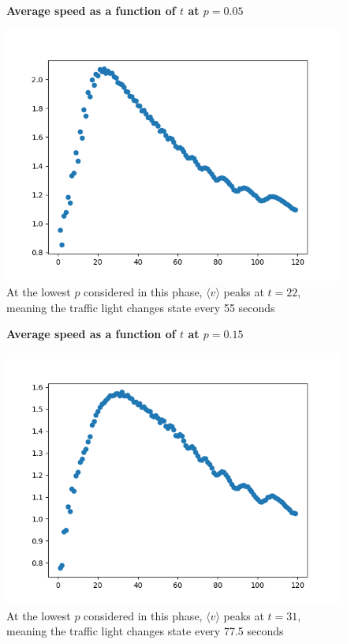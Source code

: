 \documentclass{article}
\begin{document}
\begin{figure}
\textbf{\large Average speed as a function of $t$ at $p=0.05$}\par\medskip
{}
\includegraphics[scale = 0.55, left]{./data/phase3/v_vs_t_p=0.05.png}
\vspace*{0.1cm}\hspace*{4.5cm}{\large $t$}
\caption{\label{fig} At the lowest $p$ considered in this phase, $\langle v \rangle$ peaks at $t=22$, meaning the traffic light changes state every 55 seconds}
\end{figure}

\begin{figure}
\textbf{\large Average speed as a function of $t$ at $p=0.15$}\par\medskip
{}
\includegraphics[scale = 0.55, left]{./data/phase3/v_vs_t_p=0.15.png}
\vspace*{0.1cm}\hspace*{4.5cm}{\large $t$}
\caption{\label{fig} At the lowest $p$ considered in this phase, $\langle v \rangle$ peaks at $t=31$, meaning the traffic light changes state every 77.5 seconds}
\end{figure}
\end{document}
